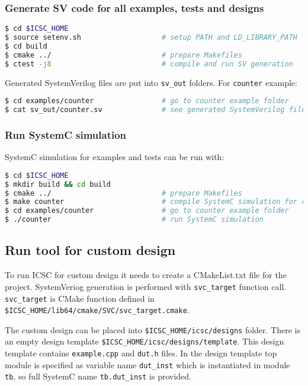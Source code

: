 \subsubsection{Generate SV code for all examples, tests and designs}
%
\begin{lstlisting}[language=bash]
$ cd $ICSC_HOME
$ source setenv.sh                   # setup PATH and LD_LIBRARY_PATH
$ cd build   
$ cmake ../                          # prepare Makefiles 
$ ctest -j8                          # compile and run SV generation
\end{lstlisting}

Generated SystemVerilog files are put into {\tt sv\_out} folders. 
For {\tt counter} example:
% 
\begin{lstlisting}[language=bash]
$ cd examples/counter                # go to counter example folder 
$ cat sv_out/counter.sv              # see generated SystemVerilog file 
\end{lstlisting}

\subsubsection{Run SystemC simulation}

SystemC simulation for examples and tests can be run with:
\begin{lstlisting}[language=bash]
$ cd $ICSC_HOME
$ mkdir build && cd build
$ cmake ../                          # prepare Makefiles 
$ make counter                       # compile SystemC simulation for counter example
$ cd examples/counter                # go to counter example folder
$ ./counter                          # run SystemC simulation 
\end{lstlisting}

\subsection{Run tool for custom design}

To run ICSC for custom design it needs to create a CMakeList.txt file for the project. SystemVeriog generation is performed with {\tt svc\_target} function call. {\tt svc\_target} is CMake function defined in {\tt \$ICSC\_HOME/lib64/cmake/SVC/svc\_target.cmake}. 

The custom design can be placed into {\tt \$ICSC\_HOME/icsc/designs} folder. 
There is an empty design template {\tt\$ICSC\_HOME/icsc/designs/template}. This design template contains {\tt example.cpp} and {\tt dut.h} files. 
In the design template top module is specified as  variable name {\tt dut\_inst} which is instantiated in module {\tt tb}, so full SystemC name {\tt tb.dut\_inst} is provided.

